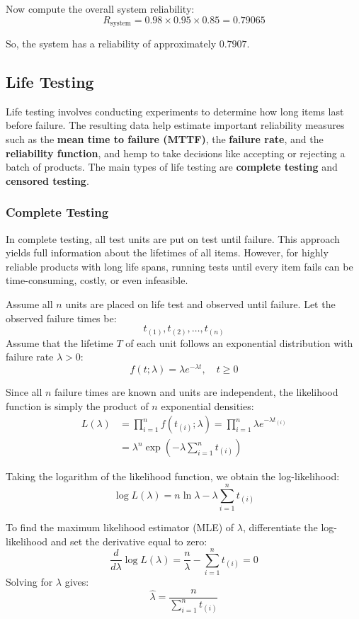 \documentclass[twoside]{book}
\begin{document}
Now compute the overall system reliability:
\[
R_{\text{system}} = 0.98 \times 0.95 \times 0.85 = 0.79065
\]

So, the system has a reliability of approximately ${0.7907}$.


\subsection{Life Testing}

Life testing involves conducting experiments to determine how long items last before failure. The resulting data help estimate important reliability measures such as the \textbf{mean time to failure (MTTF)}, the \textbf{failure rate}, and the \textbf{reliability function}, and hemp to take decisions like accepting or rejecting a batch of products. The main types of life testing are \textbf{complete testing} and \textbf{censored testing}.

\subsubsection{Complete Testing}

In complete testing, all test units are put on test until failure. This approach yields full information about the lifetimes of all items. However, for highly reliable products with long life spans, running tests until every item fails can be time-consuming, costly, or even infeasible.

Assume all $n$ units are placed on life test and observed until failure. Let the observed failure times be:
\[
t_{(1)}, t_{(2)}, \dots, t_{(n)}
\]
Assume that the lifetime $T$ of each unit follows an exponential distribution with failure rate $\lambda > 0$:
\[
f(t; \lambda) = \lambda e^{-\lambda t}, \quad t \ge 0
\]

Since all $n$ failure times are known and units are independent, the likelihood function is simply the product of $n$ exponential densities:
\begin{align*}
L(\lambda)
  &= \prod_{i=1}^n f(t_{(i)}; \lambda)
   = \prod_{i=1}^n \lambda e^{-\lambda t_{(i)}} \\
  &= \lambda^n \exp\left( -\lambda \sum_{i=1}^n t_{(i)} \right)
\end{align*}

Taking the logarithm of the likelihood function, we obtain the log-likelihood:
\[
\log L(\lambda)
= n \ln \lambda - \lambda \sum_{i=1}^n t_{(i)}
\]

To find the maximum likelihood estimator (MLE) of $\lambda$, differentiate the log-likelihood and set the derivative equal to zero:
\[
\frac{d}{d\lambda} \log L(\lambda)
= \frac{n}{\lambda} - \sum_{i=1}^n t_{(i)} = 0
\]
Solving for $\lambda$ gives:
\[
\hat{\lambda}
= \frac{n}{\displaystyle \sum_{i=1}^n t_{(i)}}
\]
\end{document}
